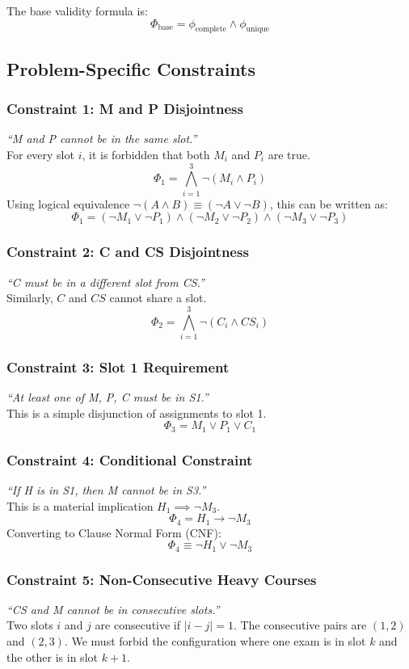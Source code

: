 \documentclass[12pt, a4paper]{article}
\begin{document}
The base validity formula is:
$$ \Phi_{\text{base}} = \phi_{\text{complete}} \land \phi_{\text{unique}} $$

\subsection{Problem-Specific Constraints}

\subsubsection*{Constraint 1: M and P Disjointness}
\textit{``M and P cannot be in the same slot.''} \\
For every slot $i$, it is forbidden that both $M_i$ and $P_i$ are true.
$$ \Phi_1 = \bigwedge_{i=1}^{3} \neg(M_i \land P_i) $$
Using logical equivalence $\neg(A \land B) \equiv (\neg A \lor \neg B)$, this can be written as:
$$ \Phi_1 = (\neg M_1 \lor \neg P_1) \land (\neg M_2 \lor \neg P_2) \land (\neg M_3 \lor \neg P_3) $$

\subsubsection*{Constraint 2: C and CS Disjointness}
\textit{``C must be in a different slot from CS.''} \\
Similarly, $C$ and $CS$ cannot share a slot.
$$ \Phi_2 = \bigwedge_{i=1}^{3} \neg(C_i \land CS_i) $$

\subsubsection*{Constraint 3: Slot 1 Requirement}
\textit{``At least one of M, P, C must be in S1.''} \\
This is a simple disjunction of assignments to slot 1.
$$ \Phi_3 = M_1 \lor P_1 \lor C_1 $$

\subsubsection*{Constraint 4: Conditional Constraint}
\textit{``If H is in S1, then M cannot be in S3.''} \\
This is a material implication $H_1 \implies \neg M_3$.
$$ \Phi_4 = H_1 \to \neg M_3 $$
Converting to Clause Normal Form (CNF):
$$ \Phi_4 \equiv \neg H_1 \lor \neg M_3 $$

\subsubsection*{Constraint 5: Non-Consecutive Heavy Courses}
\textit{``CS and M cannot be in consecutive slots.''} \\
Two slots $i$ and $j$ are consecutive if $|i - j| = 1$. The consecutive pairs are $(1,2)$ and $(2,3)$. We must forbid the configuration where one exam is in slot $k$ and the other is in slot $k+1$.
\end{document}
